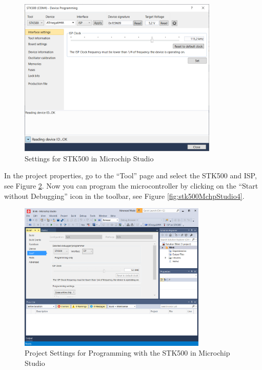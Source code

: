 \documentclass{article}
\begin{document}
\begin{figure}[htb]
\centering
\includegraphics[width=0.85\textwidth]{Pictures/STK500MchpStudio2.png}
\caption{Settings for STK500 in Microchip Studio}
\label{fig:stk500MchpStudio2}
\end{figure}

In the project properties, go to the ``Tool'' page and select the STK500 and ISP, see Figure \ref{fig:stk500MchpStudio3}. Now you can program the microcontroller by clicking on the ``Start without Debugging'' icon in the toolbar, see Figure \ref{fig:stk500MchpStudio4}. 

\begin{figure}[htb]
\centering
\includegraphics[width=0.8\textwidth]{Pictures/STK500MchpStudio3.png}
\caption{Project Settings for Programming with the STK500 in Microchip Studio}
\label{fig:stk500MchpStudio3}
\end{figure}
\end{document}
